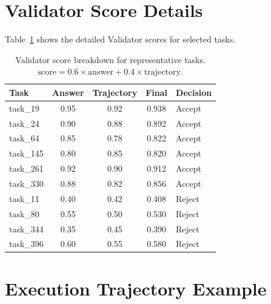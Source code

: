 \section{Validator Score Details}

Table~\ref{tab:validator-detail} shows the detailed Validator scores for selected tasks.

\begin{table}[ht]
\centering
\caption{Validator score breakdown for representative tasks. $\text{score} = 0.6 \times \text{answer} + 0.4 \times \text{trajectory}$.}
\label{tab:validator-detail}
\scriptsize
\begin{tabular}{lcccl}
\toprule
\textbf{Task} & \textbf{Answer} & \textbf{Trajectory} & \textbf{Final} & \textbf{Decision} \\
\midrule
task\_19  & 0.95 & 0.92 & 0.938 & Accept \\
task\_24  & 0.90 & 0.88 & 0.892 & Accept \\
task\_64  & 0.85 & 0.78 & 0.822 & Accept \\
task\_145 & 0.80 & 0.85 & 0.820 & Accept \\
task\_261 & 0.92 & 0.90 & 0.912 & Accept \\
task\_330 & 0.88 & 0.82 & 0.856 & Accept \\
task\_11  & 0.40 & 0.42 & 0.408 & Reject \\
task\_80  & 0.55 & 0.50 & 0.530 & Reject \\
task\_344 & 0.35 & 0.45 & 0.390 & Reject \\
task\_396 & 0.60 & 0.55 & 0.580 & Reject \\
\bottomrule
\end{tabular}
\end{table}


\section{Execution Trajectory Example}

